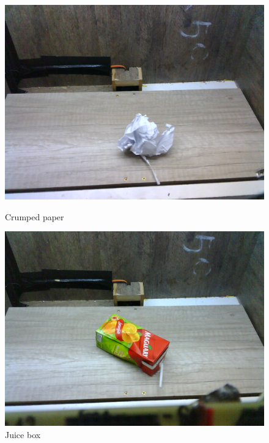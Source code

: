\documentclass[a4paper,11pt]{article}
\begin{document}
\begin{figure}[H]
  \centering
  \begin{minipage}{.5\textwidth}
    \centering
    \includegraphics[width=.8\linewidth]{Figures/Classificiations/paperball.png}
    \caption{\small{Crumped paper}}
    \label{fig:paperball}
  \end{minipage}%
  \begin{minipage}{.5\textwidth}
    \centering
    \includegraphics[width=.8\linewidth]{Figures/Classificiations/juicebox.png}
    \caption{\small{Juice box}}
    \label{fig:juicebox}
  \end{minipage}
\end{figure}
\end{document}
